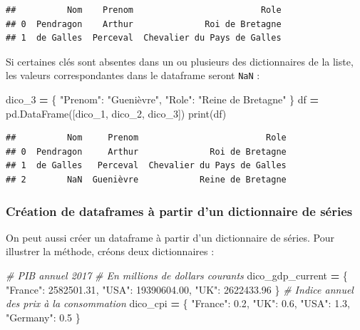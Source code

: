 \documentclass[
  12pt,
]{book}
\newenvironment{Shaded}{\begin{snugshade}}{\end{snugshade}}
\newcommand{\BuiltInTok}[1]{#1}
\newcommand{\CommentTok}[1]{\textcolor[rgb]{0.56,0.35,0.01}{\textit{#1}}}
\newcommand{\FloatTok}[1]{\textcolor[rgb]{0.00,0.00,0.81}{#1}}
\newcommand{\NormalTok}[1]{#1}
\newcommand{\OperatorTok}[1]{\textcolor[rgb]{0.81,0.36,0.00}{\textbf{#1}}}
\newcommand{\StringTok}[1]{\textcolor[rgb]{0.31,0.60,0.02}{#1}}
\numberwithin{equation}{section}
\numberwithin{countremarque}{section}
\begin{document}
\begin{lstlisting}
##          Nom    Prenom                         Role
## 0  Pendragon    Arthur              Roi de Bretagne
## 1  de Galles  Perceval  Chevalier du Pays de Galles
\end{lstlisting}

Si certaines clés sont absentes dans un ou plusieurs des dictionnaires de la liste, les valeurs correspondantes dans le dataframe seront \texttt{NaN} :

\begin{Shaded}
\begin{Highlighting}[]
\NormalTok{dico\_3 }\OperatorTok{=}\NormalTok{ \{}
    \StringTok{"Prenom"}\NormalTok{: }\StringTok{"Guenièvre"}\NormalTok{,}
    \StringTok{"Role"}\NormalTok{: }\StringTok{"Reine de Bretagne"}
\NormalTok{\}}
\NormalTok{df }\OperatorTok{=}\NormalTok{ pd.DataFrame([dico\_1, dico\_2, dico\_3])}
\BuiltInTok{print}\NormalTok{(df)}
\end{Highlighting}
\end{Shaded}

\begin{lstlisting}
##          Nom     Prenom                         Role
## 0  Pendragon     Arthur              Roi de Bretagne
## 1  de Galles   Perceval  Chevalier du Pays de Galles
## 2        NaN  Guenièvre            Reine de Bretagne
\end{lstlisting}

\subsubsection{Création de dataframes à partir d'un dictionnaire de séries}\label{cruxe9ation-de-dataframes-uxe0-partir-dun-dictionnaire-de-suxe9ries}

On peut aussi créer un dataframe à partir d'un dictionnaire de séries. Pour illustrer la méthode, créons deux dictionnaires :

\begin{Shaded}
\begin{Highlighting}[]
\CommentTok{\# PIB annuel 2017}
\CommentTok{\# En millions de dollars courants}
\NormalTok{dico\_gdp\_current }\OperatorTok{=}\NormalTok{ \{}
    \StringTok{"France"}\NormalTok{: }\FloatTok{2582501.31}\NormalTok{,}
    \StringTok{"USA"}\NormalTok{: }\FloatTok{19390604.00}\NormalTok{,}
    \StringTok{"UK"}\NormalTok{: }\FloatTok{2622433.96}
\NormalTok{\}}
\CommentTok{\# Indice annuel des prix à la consommation}
\NormalTok{dico\_cpi }\OperatorTok{=}\NormalTok{ \{}
    \StringTok{"France"}\NormalTok{: }\FloatTok{0.2}\NormalTok{,}
    \StringTok{"UK"}\NormalTok{: }\FloatTok{0.6}\NormalTok{,}
    \StringTok{"USA"}\NormalTok{: }\FloatTok{1.3}\NormalTok{,}
    \StringTok{"Germany"}\NormalTok{: }\FloatTok{0.5}
\NormalTok{\}}
\end{Highlighting}
\end{Shaded}
\end{document}

